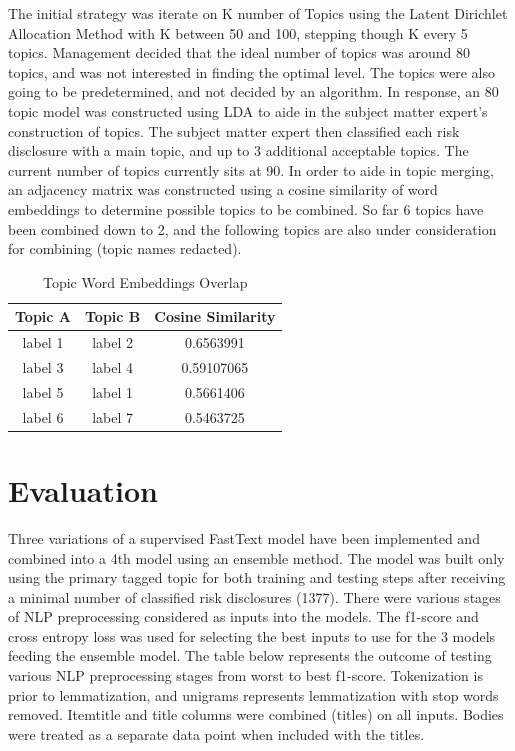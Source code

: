\documentclass[11pt]{article}
\begin{document}
\vspace{5 mm}

The initial strategy was iterate on K number of Topics using the Latent Dirichlet Allocation Method with K between 50 and 100, stepping though K every 5 topics.  Management decided that the ideal number of topics was around 80 topics, and was not interested in finding the optimal level. The topics were also going to be predetermined, and not decided by an algorithm.  In response, an 80 topic model was constructed using LDA to aide in the subject matter expert's construction of topics.  The subject matter expert then classified each risk disclosure with a main topic, and up to 3 additional acceptable topics.  The current number of topics currently sits at 90.  In order to aide in topic merging, an adjacency matrix was constructed using a cosine similarity of word embeddings to determine possible topics to be combined.  So far 6 topics have been combined down to 2, and the following topics are also under consideration for combining (topic names redacted). 

\begin{table}[h]
\centering
\begin{tabular}{ c | c | c}
  \hline
  Topic A & Topic B & Cosine Similarity \\
  \hline   
 
label 1 & label 2 & 0.6563991 \\
label 3 & label 4 & 0.59107065 \\
label 5 & label 1 & 0.5661406 \\
label 6 & label 7 & 0.5463725 \\
  \hline
\end{tabular}
\caption{Topic Word Embeddings Overlap}
\label{tbl:topic_overlap}
\end{table}

\section{Evaluation}

Three variations of a supervised FastText model have been implemented and combined into a 4th model using an ensemble method.  The model was built only using the primary tagged topic for both training and testing steps after receiving a minimal number of classified risk disclosures (1377).  There were various stages of NLP preprocessing considered as inputs into the models.  The f1-score and cross entropy loss was used for selecting the best inputs to use for the 3 models feeding the ensemble model.  The table below represents the outcome of testing various NLP preprocessing stages from worst to best f1-score.  Tokenization is prior to lemmatization, and unigrams represents lemmatization with stop words removed. Itemtitle and title columns were combined (titles) on all inputs.  Bodies were treated as a separate data point when included with the titles.
\end{document}
